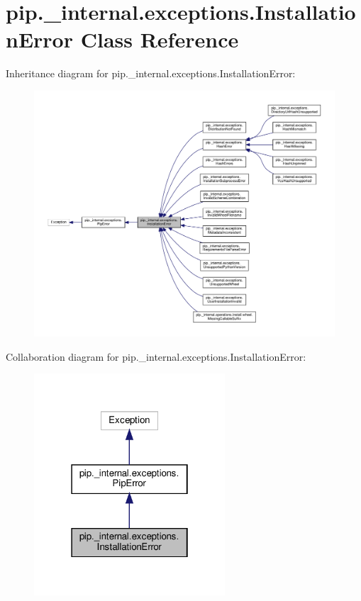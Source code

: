 \hypertarget{classpip_1_1__internal_1_1exceptions_1_1InstallationError}{}\section{pip.\+\_\+internal.\+exceptions.\+Installation\+Error Class Reference}
\label{classpip_1_1__internal_1_1exceptions_1_1InstallationError}


Inheritance diagram for pip.\+\_\+internal.\+exceptions.\+Installation\+Error\+:
\nopagebreak
\begin{figure}[H]
\begin{center}
\leavevmode
\includegraphics[width=350pt]{classpip_1_1__internal_1_1exceptions_1_1InstallationError__inherit__graph}
\end{center}
\end{figure}


Collaboration diagram for pip.\+\_\+internal.\+exceptions.\+Installation\+Error\+:
\nopagebreak
\begin{figure}[H]
\begin{center}
\leavevmode
\includegraphics[width=202pt]{classpip_1_1__internal_1_1exceptions_1_1InstallationError__coll__graph}
\end{center}
\end{figure}


